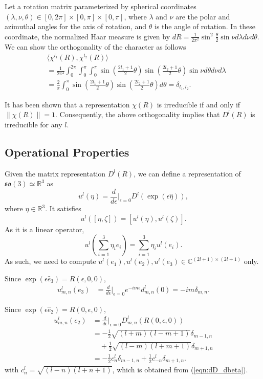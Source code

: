 \documentclass{ieeetran}
\newcommand{\pair}[1]{\ensuremath{\langle #1 \rangle}}
\newcommand{\refeqn}[1]{(\ref{eqn:#1})}
\newcommand{\so}{\ensuremath{\mathfrak{so}(3)}}
\renewcommand{\Re}{\ensuremath{\mathbb{R}}}
\newcommand{\Cp}{\ensuremath{\mathbb{C}}}
\begin{document}
Let a rotation matrix parameterized by spherical coordinates $(\lambda,\nu,\theta)\in[0,2\pi]\times[0,\pi]\times[0,\pi]$, where $\lambda$ and $\nu$ are the polar and azimuthal angles for the axis of rotation, and $\theta$ is the angle of rotation. In these coordinate, the normalized Haar measure is given by $dR=\frac{1}{2\pi^2} \sin^2\frac{\theta}{2} \sin\nu d\lambda d\nu d\theta$. We can show the orthogonality of the character as follows
\begin{align*}
&\pair{\chi^{l_1}(R), \chi^{l_2}(R)}
\\
&=\frac{1}{2\pi^2} \int_{0}^{2\pi} \int_{0}^\pi \int_0^\pi \sin(\frac{2l_1+1}{2}\theta)\sin(\frac{2l_2+1}{2}\theta) \sin\nu   d\theta  d\nu d\lambda\\
&=\frac{2}{\pi} \int_0^\pi \sin(\frac{2l_1+1}{2}\theta)\sin(\frac{2l_2+1}{2}\theta)  d\theta =\delta_{l_1,l_2}.
\end{align*}

It has been shown that a representation $\chi(R)$ is irreducible if and only if $\|\chi(R)\|=1$. Consequently, the above orthogonality implies that $D^l(R)$ is irreducible for any $l$.


\subsection{Operational Properties}

Given the matrix representation $D^l(R)$, we can define a representation of $\so\simeq \Re^3$ as
\[
u^l(\eta)= \frac{d}{d\epsilon}\bigg|_{\epsilon=0} D^l(\exp(\epsilon\hat\eta)),
\]
where $\eta\in\Re^3$. It satisfies
\[
u^l([\eta,\zeta])=[u^l(\eta),u^l(\zeta)].
\]
As it is a linear operator,
\[
u^l(\sum_{i=1}^3 \eta_i e_i) = \sum_{i=1}^3 \eta_i u^l(e_i).
\]
As such, we need to compute $u^l(e_1),u^l(e_2),u^l(e_3)\in\Cp^{(2l+1)\times(2l+1)}$ only.

Since $\exp(\epsilon\hat e_3) = R(\epsilon,0,0)$,
\begin{align}
u^l_{m,n}(e_3) & = \frac{d}{d\epsilon}\bigg|_{\epsilon=0} e^{-im\epsilon}d^l_{m,n}(0)=-im\delta_{m,n}.
\end{align}

Since $\exp(\epsilon\hat e_2) = R(0,\epsilon,0)$, 
\begin{align}
u^l_{m,n}(e_2) & = \frac{d}{d\epsilon}\bigg|_{\epsilon=0} D^l_{m,n}(R(0,\epsilon,0))\nonumber\\
& = -\frac{1}{2}\sqrt{(l+m)(l-m+1)} \delta_{m-1,n}\nonumber\\
& \quad + \frac{1}{2}\sqrt{(l-m)(l+m+1)} \delta_{m+1,n}\nonumber\\
& = -\frac{1}{2}c^l_n \delta_{m-1,n}+\frac{1}{2}c^l_{-n} \delta_{m+1,n}.
\end{align}
with $c^l_n=\sqrt{(l-n)(l+n+1)}$, which is obtained from \refeqn{dD_dbeta}.
\end{document}
